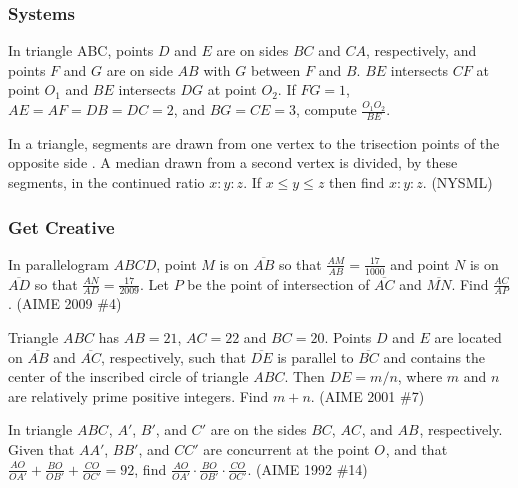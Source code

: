 \subsubsection{Systems}
\begin{problem}
In triangle ABC, points $D$ and $E$ are on sides $BC$ and $CA$, respectively, and points $F$ and $G$ are on side $AB$ with $G$ between $F$ and $B$. $BE$ intersects $CF$ at point $O_1$ and $BE$ intersects $DG$ at point $O_2$. If $FG = 1$, $AE = AF = DB = DC = 2$, and $BG = CE = 3$, compute $\tfrac{O_1O_2}{BE}$.
\end{problem}
\begin{problem}
In a triangle, segments are drawn from one vertex to the trisection points of the opposite side . A median drawn from a second vertex is divided, by these segments, in the continued ratio $x : y : z$. If $x \leq y \leq z$ then find $x : y : z$. (NYSML)
\end{problem}
\subsubsection{Get Creative}
\begin{problem}
In parallelogram $ABCD$, point $M$ is on $\overline{AB}$ so that $\frac {AM}{AB} = \frac {17}{1000}$ and point $N$ is on $\overline{AD}$ so that $\frac {AN}{AD} = \frac {17}{2009}$. Let $P$ be the point of intersection of $\overline{AC}$ and $\overline{MN}$. Find $\frac {AC}{AP}$. (AIME 2009 \#4)
\end{problem}
\begin{problem}
Triangle $ABC$ has $AB=21$, $AC=22$ and $BC=20$. Points $D$ and $E$ are located on $\overline{AB}$ and $\overline{AC}$, respectively, such that $\overline{DE}$ is parallel to $\overline{BC}$ and contains the center of the inscribed circle of triangle $ABC$. Then $DE=m/n$, where $m$ and $n$ are relatively prime positive integers. Find $m+n$. (AIME 2001 \#7)
\end{problem}
\begin{problem}
In triangle $ABC^{}_{}$, $A'$, $B'$, and $C'$ are on the sides $BC$, $AC^{}_{}$, and $AB^{}_{}$, respectively. Given that $AA'$, $BB'$, and $CC'$ are concurrent at the point $O^{}_{}$, and that $\frac{AO^{}_{}}{OA'}+\frac{BO}{OB'}+\frac{CO}{OC'}=92$, find $\frac{AO}{OA'}\cdot \frac{BO}{OB'}\cdot \frac{CO}{OC'}$. (AIME 1992 \#14)
\end{problem}